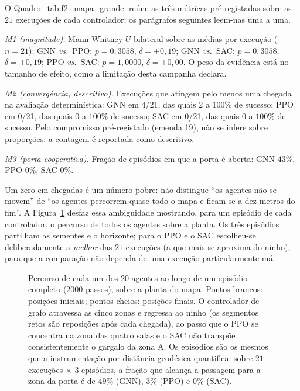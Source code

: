 O Quadro~\ref{tab:f2_mapa_grande} reúne as três métricas pré-registadas sobre as
$21$ execuções de cada controlador; os parágrafos seguintes leem-nas uma a uma.

\emph{M1 (magnitude).} Mann-Whitney $U$ bilateral sobre as médias por execução ($n = 21$): GNN \emph{vs.}\ PPO: $p = 0{,}3058$, $\delta = +0{,}19$; GNN \emph{vs.}\ SAC: $p = 0{,}3058$, $\delta = +0{,}19$; PPO \emph{vs.}\ SAC: $p = 1{,}0000$, $\delta = +0{,}00$. O peso da evidência está no tamanho de efeito, como a limitação desta campanha declara.

\emph{M2 (convergência, descritivo).} Execuções que atingem pelo menos uma chegada na avaliação determinística: GNN em 4/21, das quais 2 a $100\%$ de sucesso; PPO em 0/21, das quais 0 a $100\%$ de sucesso; SAC em 0/21, das quais 0 a $100\%$ de sucesso. Pelo compromisso pré-registado (emenda 19), não se infere sobre proporções: a contagem é reportada como descritivo.

\emph{M3 (porta cooperativa).} Fração de episódios em que a porta é aberta: GNN $43\%$, PPO $0\%$, SAC $0\%$.

Um zero em chegadas é um número pobre: não distingue ``os agentes não se
movem'' de ``os agentes percorrem quase todo o mapa e ficam-se a dez metros do
fim''. A Figura~\ref{fig:mapa_grande_rastos} desfaz essa ambiguidade
mostrando, para um episódio de cada controlador, o percurso de todos os agentes
sobre a planta. Os três episódios partilham as sementes e o horizonte; para o
PPO e o SAC escolheu-se deliberadamente a \emph{melhor} das $21$ execuções
(a que mais se aproxima do ninho), para que a comparação não dependa de
uma execução particularmente má.

\begin{figure}[!htbp]
    \centering
    \caption[Percursos dos agentes no mapa composto, por controlador]{Percurso de
      cada um dos $20$ agentes ao longo de um episódio completo ($2000$ passos),
      sobre a planta do mapa. Pontos brancos: posições iniciais; pontos cheios:
      posições finais. O controlador de grafo atravessa as cinco zonas e
      regressa ao ninho (os segmentos retos são reposições após cada chegada),
      ao passo que o PPO se concentra na zona das quatro salas e o SAC não
      transpõe consistentemente o gargalo da zona A. Os episódios são os mesmos
      que a instrumentação por distância geodésica quantifica: sobre $21$
      execuções $\times$ $3$ episódios, a fração que alcança a passagem para a
      zona da porta é de $49\%$ (GNN), $3\%$ (PPO) e $0\%$ (SAC).}
    \label{fig:mapa_grande_rastos}
\end{figure}

